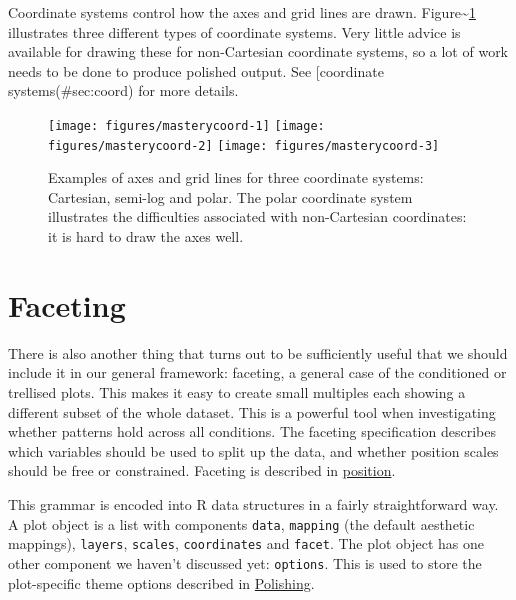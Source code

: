 Coordinate systems control how the axes and grid lines are drawn.
Figure\textasciitilde{}\ref{fig:coord} illustrates three different types
of coordinate systems. Very little advice is available for drawing these
for non-Cartesian coordinate systems, so a lot of work needs to be done
to produce polished output. See {[}coordinate systems(\#sec:coord) for
more details.

\begin{figure}
\texttt{[image: figures/masterycoord-1]} \texttt{[image: figures/masterycoord-2]} \texttt{[image: figures/masterycoord-3]} \caption{Examples of axes and grid lines for three coordinate systems: Cartesian, semi-log and polar. The polar coordinate system illustrates the difficulties associated with non-Cartesian coordinates: it is hard to draw the axes well.\label{fig:coord}}
\end{figure}

\section{Faceting}\label{sec:intro-faceting}

There is also another thing that turns out to be sufficiently useful
that we should include it in our general framework: faceting, a general
case of the conditioned or trellised plots. This makes it easy to create
small multiples each showing a different subset of the whole dataset.
This is a powerful tool when investigating whether patterns hold across
all conditions. The faceting specification describes which variables
should be used to split up the data, and whether position scales should
be free or constrained. Faceting is described in
\hyperref[cha:position]{position}.


This grammar is encoded into R data structures in a fairly
straightforward way. A plot object is a list with components
\texttt{data}, \texttt{mapping} (the default aesthetic mappings),
\texttt{layers}, \texttt{scales}, \texttt{coordinates} and
\texttt{facet}. The plot object has one other component we haven't
discussed yet: \texttt{options}. This is used to store the plot-specific
theme options described in \hyperref[cha:polishing]{Polishing}.

